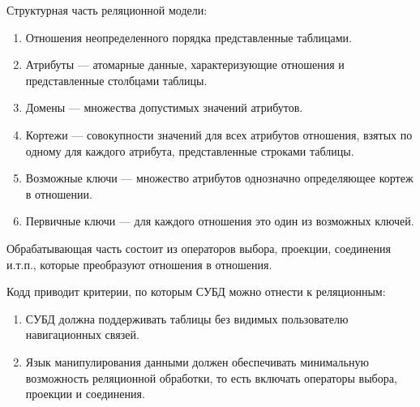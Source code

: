 \documentclass[12pt]{report}
\theoremstyle{definition}
\begin{document}
Структурная часть реляционной модели:
\begin{enumerate}
\item Отношения неопределенного порядка представленные таблицами.
\item Атрибуты --- атомарные данные, характеризующие отношения и
  представленные столбцами таблицы.
\item Домены --- множества допустимых значений атрибутов.
\item Кортежи --- совокупности значений для всех атрибутов
  отношения, взятых по одному для каждого атрибута, представленные
  строками таблицы.
\item Возможные ключи --- множество атрибутов однозначно определяющее
  кортеж в отношении.
\item Первичные ключи --- для каждого отношения это один из возможных ключей.
\end{enumerate}

Обрабатывающая часть состоит из операторов выбора, проекции, соединения и.т.п.,
которые преобразуют отношения в отношения.

Кодд приводит критерии, по которым СУБД можно отнести к реляционным:
\begin{enumerate}
\item СУБД должна поддерживать таблицы без видимых пользователю
  навигационных связей.
\item Язык манипулирования данными должен обеспечивать минимальную
  возможность реляционной обработки, то есть включать операторы выбора,
  проекции и соединения.
\end{enumerate}

\end{document}
